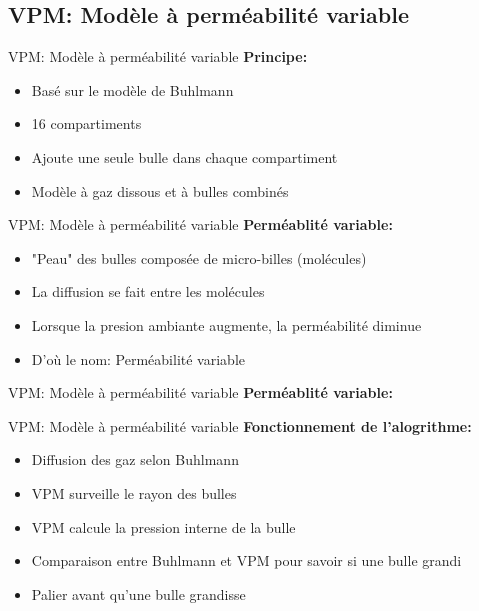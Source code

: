 \subsection{VPM: Modèle à perméabilité variable}

\begin{frame}{VPM: Modèle à perméabilité variable}
	\textbf{Principe:}
	\begin{itemize}
		\item Basé sur le modèle de Buhlmann
		\item 16 compartiments
		\item Ajoute une seule bulle dans chaque compartiment
		\item Modèle à gaz dissous et à bulles combinés
	\end{itemize}
\end{frame}

\begin{frame}{VPM: Modèle à perméabilité variable}
	\textbf{Perméablité variable:}
	\begin{itemize}
		\item "Peau" des bulles composée de micro-billes (molécules)
		\item La diffusion se fait entre les molécules
		\item Lorsque la presion ambiante augmente, la perméabilité diminue
		\item D'où le nom: Perméabilité variable
	\end{itemize}
\end{frame}

\begin{frame}{VPM: Modèle à perméabilité variable}
	\textbf{Perméablité variable:}\\
\end{frame}

\begin{frame}{VPM: Modèle à perméabilité variable}  
	\textbf{Fonctionnement de l'alogrithme:}
	\begin{itemize}
		\item Diffusion des gaz selon Buhlmann
		\item VPM surveille le rayon des bulles
		\item VPM calcule la pression interne de la bulle
		\item Comparaison entre Buhlmann et VPM pour savoir si une bulle grandi
		\item Palier avant qu'une bulle grandisse
	\end{itemize}
\end{frame}

